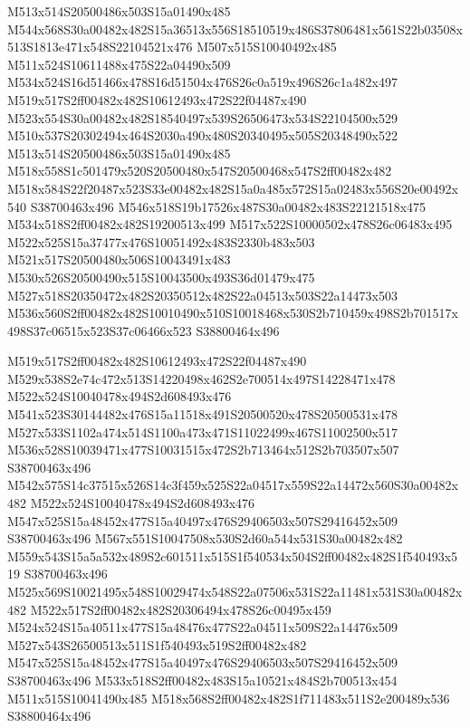 \documentclass{article}
\begin{document}
\begin{multicols}{2}
M513x514S20500486x503S15a01490x485 M544x568S30a00482x482S15a36513x556S18510519x486S37806481x561S22b03508x513S1813e471x548S22104521x476 M507x515S10040492x485 M511x524S10611488x475S22a04490x509 M534x524S16d51466x478S16d51504x476S26c0a519x496S26c1a482x497 M519x517S2ff00482x482S10612493x472S22f04487x490 M523x554S30a00482x482S18540497x539S26506473x534S22104500x529 M510x537S20302494x464S2030a490x480S20340495x505S20348490x522 M513x514S20500486x503S15a01490x485 M518x558S1c501479x520S20500480x547S20500468x547S2ff00482x482 M518x584S22f20487x523S33e00482x482S15a0a485x572S15a02483x556S20e00492x540 S38700463x496 M546x518S19b17526x487S30a00482x483S22121518x475 M534x518S2ff00482x482S19200513x499 M517x522S10000502x478S26c06483x495 M522x525S15a37477x476S10051492x483S2330b483x503 M521x517S20500480x506S10043491x483 M530x526S20500490x515S10043500x493S36d01479x475 M527x518S20350472x482S20350512x482S22a04513x503S22a14473x503 M536x560S2ff00482x482S10010490x510S10018468x530S2b710459x498S2b701517x498S37c06515x523S37c06466x523 S38800464x496

M519x517S2ff00482x482S10612493x472S22f04487x490 M529x538S2e74c472x513S14220498x462S2e700514x497S14228471x478 M522x524S10040478x494S2d608493x476 M541x523S30144482x476S15a11518x491S20500520x478S20500531x478 M527x533S1102a474x514S1100a473x471S11022499x467S11002500x517 M536x528S10039471x477S10031515x472S2b713464x512S2b703507x507 S38700463x496 M542x575S14c37515x526S14c3f459x525S22a04517x559S22a14472x560S30a00482x482 M522x524S10040478x494S2d608493x476 M547x525S15a48452x477S15a40497x476S29406503x507S29416452x509 S38700463x496 M567x551S10047508x530S2d60a544x531S30a00482x482 M559x543S15a5a532x489S2c601511x515S1f540534x504S2ff00482x482S1f540493x519 S38700463x496 M525x569S10021495x548S10029474x548S22a07506x531S22a11481x531S30a00482x482 M522x517S2ff00482x482S20306494x478S26c00495x459 M524x524S15a40511x477S15a48476x477S22a04511x509S22a14476x509 M527x543S26500513x511S1f540493x519S2ff00482x482 M547x525S15a48452x477S15a40497x476S29406503x507S29416452x509 S38700463x496 M533x518S2ff00482x483S15a10521x484S2b700513x454 M511x515S10041490x485 M518x568S2ff00482x482S1f711483x511S2e200489x536 S38800464x496


\end{multicols}
\end{document}
